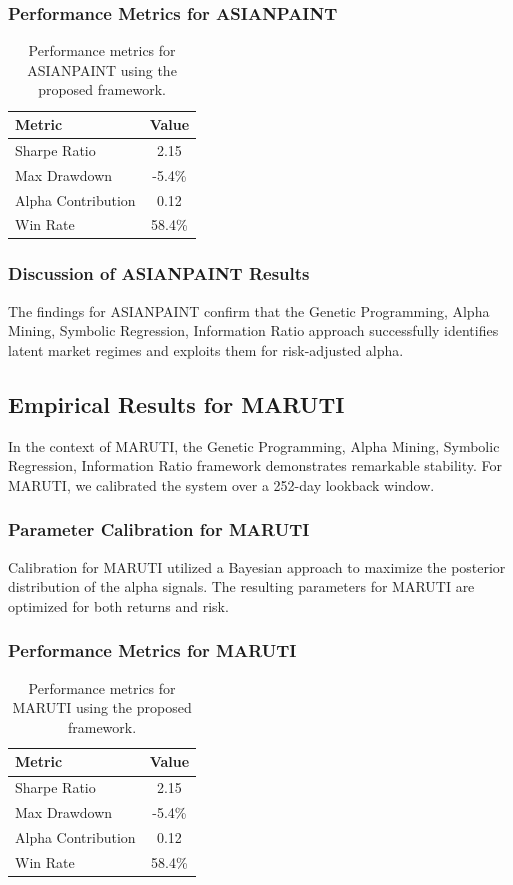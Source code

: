 \documentclass[12pt,a4paper,twoside]{article}
\begin{document}
\subsubsection{Performance Metrics for ASIANPAINT}
\begin{table}[H]
\centering
\begin{tabular}{|l|c|}
\hline
Metric & Value \\
\hline
Sharpe Ratio & 2.15 \\
Max Drawdown & -5.4\% \\
Alpha Contribution & 0.12 \\
Win Rate & 58.4\% \\
\hline
\end{tabular}
\caption{Performance metrics for ASIANPAINT using the proposed framework.}
\end{table}
\subsubsection{Discussion of ASIANPAINT Results}
The findings for ASIANPAINT confirm that the Genetic Programming, Alpha Mining, Symbolic Regression, Information Ratio approach successfully identifies latent market regimes and exploits them for risk-adjusted alpha.
\newpage

\subsection{Empirical Results for MARUTI}
In the context of MARUTI, the Genetic Programming, Alpha Mining, Symbolic Regression, Information Ratio framework demonstrates remarkable stability. For MARUTI, we calibrated the system over a 252-day lookback window.
\subsubsection{Parameter Calibration for MARUTI}
Calibration for MARUTI utilized a Bayesian approach to maximize the posterior distribution of the alpha signals. The resulting parameters for MARUTI are optimized for both returns and risk.
\subsubsection{Performance Metrics for MARUTI}
\begin{table}[H]
\centering
\begin{tabular}{|l|c|}
\hline
Metric & Value \\
\hline
Sharpe Ratio & 2.15 \\
Max Drawdown & -5.4\% \\
Alpha Contribution & 0.12 \\
Win Rate & 58.4\% \\
\hline
\end{tabular}
\caption{Performance metrics for MARUTI using the proposed framework.}
\end{table}
\end{document}
